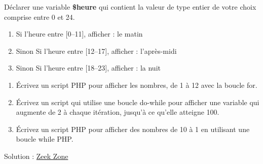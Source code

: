 \documentclass[10pt,a4paper,notitlepage]{article}
\begin{document}
	\begin{definition}
		\hspace{2ex} 
		Déclarer une variable \textbf{{\color{orange} \$heure}} qui contient la valeur de type entier de votre choix comprise entre 0 et 24. 
		\begin{enumerate}
			\item Si l'heure entre [0–11], afficher : le matin
			\item Sinon Si l'heure entre [12–17], afficher : l'après-midi
			\item Sinon Si l'heure entre [18–23], afficher : la nuit
		\end{enumerate}
		
	\end{definition}
	\begin{definition}
		\hspace{2ex} 
			\begin{enumerate}
			\item Écrivez un script PHP pour afficher les nombres, de 1 à 12 avec la boucle for. 
			\item Écrivez un script  qui utilise une boucle do-while pour afficher une variable qui augmente de 2 à chaque itération, jusqu'à ce qu'elle atteigne 100.
			\item Écrivez un script PHP pour afficher des nombres de 10 à 1 en utilisant une boucle while PHP.
		\end{enumerate}
	\end{definition}
	
	\begin{center}
		Solution : \href{https://www.youtube.com/watch?v=OVFLx9-yfiw&list=PLF2W_rB6QiYBYg4-19vGs8TMTS3GbHM0H&index=1}{\color{blue} Zeek Zone}
	\end{center}
	
\end{document}
